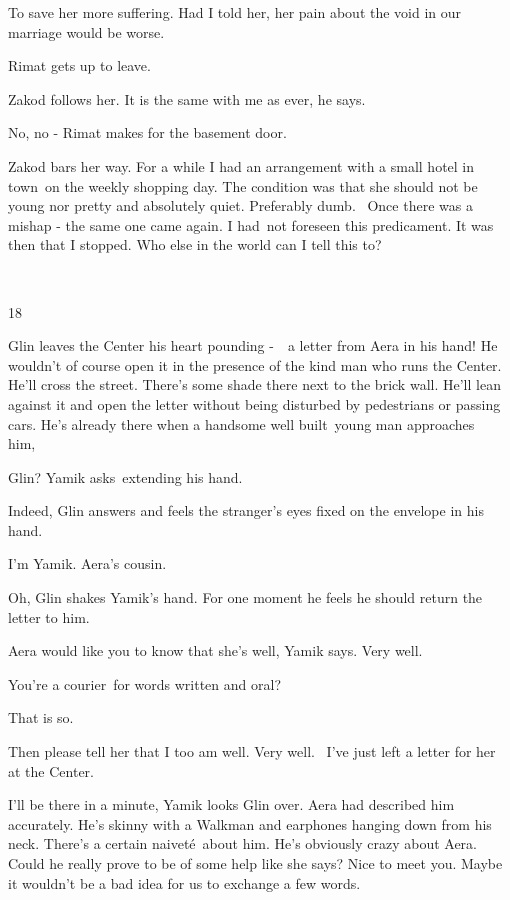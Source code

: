 \documentclass[twoside,11pt]{book}
\begin{document}
{\textquotedbl}To save her more suffering. Had I told her, her pain about the void in our marriage would be
worse.{\textquotedbl} 

Rimat gets up to leave.

Zakod follows her. {\textquotedbl}It is the same with me as ever,{\textquotedbl} he says. 

{\textquotedbl}No, no -{\textquotedbl} Rimat makes for the basement door. 

Zakod bars her way. {\textquotedbl}For a while I had an arrangement with a small hotel in town\ on the weekly shopping
day. The condition was that she should not be young nor pretty and absolutely quiet. Preferably dumb. ~Once there was a
mishap - the same one came again. I had\ not foreseen this predicament. It was then that I stopped. Who else in the
world can I tell this to?{\textquotedbl} 

~

18 

Glin leaves the Center his heart pounding -\ \ a letter from Aera in his hand! He wouldn't of course open it in the
presence of the kind man who runs the Center. He'll cross the street. There's some shade there next to the brick wall.
He'll lean against it and open the letter without being disturbed by pedestrians or passing cars. He's already there
when a handsome well built\ young man approaches him,~\ 

{\textquotedbl}Glin?{\textquotedbl} Yamik asks~extending his hand. 

{\textquotedbl}Indeed,{\textquotedbl} Glin answers and feels the stranger's eyes fixed on the envelope in his hand. 

{\textquotedbl}I'm Yamik. Aera's cousin.{\textquotedbl} 

{\textquotedbl}Oh,{\textquotedbl} Glin shakes Yamik's hand. For one moment he feels he should return the letter to him.
~

{\textquotedbl}Aera would like you to know that she's well,{\textquotedbl} Yamik says. {\textquotedbl}Very
well.{\textquotedbl} 

{\textquotedbl}You're a courier\ for words written and oral?{\textquotedbl} 

{\textquotedbl}That is so.{\textquotedbl} 

{\textquotedbl}Then please tell her that I too am well. Very well.~ I've just left a letter for her at the
Center.{\textquotedbl} 

{\textquotedbl}I'll be there in a minute,{\textquotedbl} Yamik looks Glin over. Aera had described him accurately. He's
skinny with a Walkman and earphones hanging down from his neck. There's a certain naivet\'e\ about him. He's obviously
crazy about Aera. Could he really prove to be of some help like she says? {\textquotedbl}Nice to meet you. Maybe it
wouldn't be a bad idea for us to exchange a few words.{\textquotedbl} 
\end{document}
